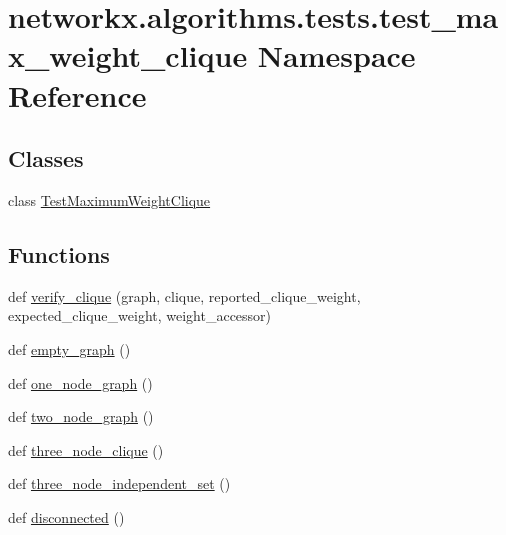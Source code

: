 \hypertarget{namespacenetworkx_1_1algorithms_1_1tests_1_1test__max__weight__clique}{}\section{networkx.\+algorithms.\+tests.\+test\+\_\+max\+\_\+weight\+\_\+clique Namespace Reference}
\label{namespacenetworkx_1_1algorithms_1_1tests_1_1test__max__weight__clique}
\subsection*{Classes}
\begin{DoxyCompactItemize}
\item 
class \hyperlink{classnetworkx_1_1algorithms_1_1tests_1_1test__max__weight__clique_1_1TestMaximumWeightClique}{Test\+Maximum\+Weight\+Clique}
\end{DoxyCompactItemize}
\subsection*{Functions}
\begin{DoxyCompactItemize}
\item 
def \hyperlink{namespacenetworkx_1_1algorithms_1_1tests_1_1test__max__weight__clique_aa251fbcd54de796651b6855e0dd07e08}{verify\+\_\+clique} (graph, clique, reported\+\_\+clique\+\_\+weight, expected\+\_\+clique\+\_\+weight, weight\+\_\+accessor)
\item 
def \hyperlink{namespacenetworkx_1_1algorithms_1_1tests_1_1test__max__weight__clique_a24b63e6bcca2d0552a398aa5456f05b6}{empty\+\_\+graph} ()
\item 
def \hyperlink{namespacenetworkx_1_1algorithms_1_1tests_1_1test__max__weight__clique_a4ba21a9ba3cfde7c4d36d9b8d05b4410}{one\+\_\+node\+\_\+graph} ()
\item 
def \hyperlink{namespacenetworkx_1_1algorithms_1_1tests_1_1test__max__weight__clique_a7b466e4f436acc80666d12531f4591d7}{two\+\_\+node\+\_\+graph} ()
\item 
def \hyperlink{namespacenetworkx_1_1algorithms_1_1tests_1_1test__max__weight__clique_a68438349769d55b62ab4aa6d25a9adec}{three\+\_\+node\+\_\+clique} ()
\item 
def \hyperlink{namespacenetworkx_1_1algorithms_1_1tests_1_1test__max__weight__clique_ac4f4185470b690e3c7e6a93fe04ba365}{three\+\_\+node\+\_\+independent\+\_\+set} ()
\item 
def \hyperlink{namespacenetworkx_1_1algorithms_1_1tests_1_1test__max__weight__clique_a5c47953e17e1b2e5f0291ff9c9f91b1d}{disconnected} ()
\end{DoxyCompactItemize}
